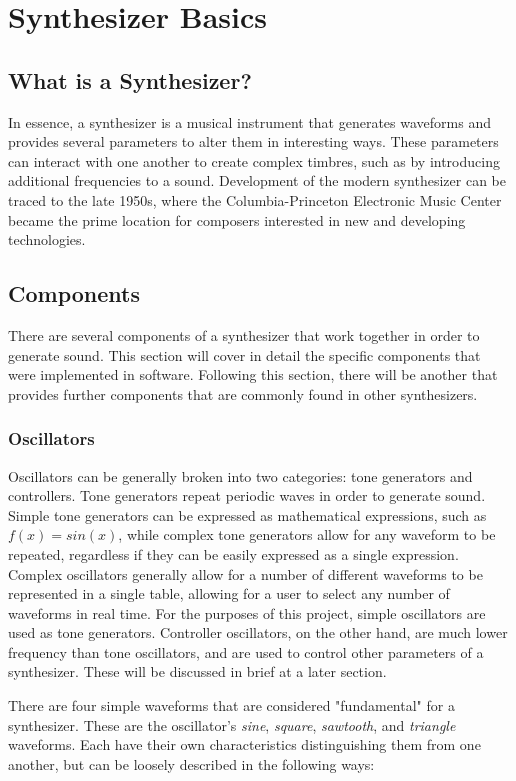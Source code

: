 \documentclass[12pt]{article}
\begin{document}
\section{Synthesizer Basics}

\subsection{What is a Synthesizer?}
In essence, a synthesizer is a musical instrument that generates waveforms and provides several parameters to alter them in interesting ways. These parameters can interact with one another to create complex timbres, such as by introducing additional frequencies to a sound. Development of the modern synthesizer can be traced to the late 1950s, where the Columbia-Princeton Electronic Music Center became the prime location for composers interested in new and developing technologies. \cite{Pejrolo_2017}

\subsection{Components}
There are several components of a synthesizer that work together in order to generate sound. This section will cover in detail the specific components that were implemented in software. Following this section, there will be another that provides further components that are commonly found in other synthesizers.

\subsubsection{Oscillators}
Oscillators can be generally broken into two categories: tone generators and controllers. Tone generators repeat periodic waves in order to generate sound. Simple tone generators can be expressed as mathematical expressions, such as \(f(x) = sin(x)\), while complex tone generators allow for any waveform to be repeated, regardless if they can be easily expressed as a single expression. Complex oscillators generally allow for a number of different waveforms to be represented in a single table, allowing for a user to select any number of waveforms in real time. For the purposes of this project, simple oscillators are used as tone generators. Controller oscillators, on the other hand, are much lower frequency than tone oscillators, and are used to control other parameters of a synthesizer. These will be discussed in brief at a later section.

There are four simple waveforms that are considered "fundamental" for a synthesizer. These are the oscillator's \textit{sine}, \textit{square}, \textit{sawtooth}, and \textit{triangle} waveforms. Each have their own characteristics distinguishing them from one another, but can be loosely described in the following ways:
\end{document}
